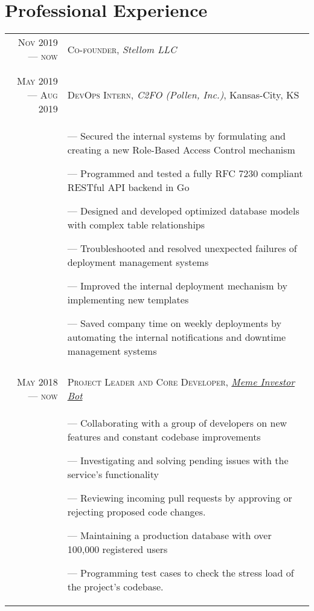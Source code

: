 \documentclass[letterpaper,10pt]{article}
\begin{document}
\section{Professional Experience}
\begin{tabular}{r|p{11cm}}
   \textsc{Nov 2019 --- now} &  \textsc{Co-founder}, \emph{Stellom LLC}\\&\footnotesize{
   } \\\multicolumn{2}{c}{}\\
  
  \textsc{May 2019 --- Aug 2019} &  \textsc{DevOps Intern}, \emph{C2FO (Pollen, Inc.)}, Kansas-City, KS\\&\footnotesize{
    --- Secured the internal systems by formulating and creating a new Role-Based Access Control mechanism
   
    --- Programmed and tested a fully RFC 7230 compliant RESTful API backend in Go 
    
    --- Designed and developed optimized database models with complex table relationships
    
    --- Troubleshooted and resolved unexpected failures of deployment management systems
    
    --- Improved the internal deployment mechanism by implementing new templates
    
    --- Saved company time on weekly deployments by automating the internal notifications and downtime management systems
  } \\\multicolumn{2}{c}{}\\
  
  \textsc{May 2018 --- now} &  \textsc{Project Leader and Core Developer}, \emph{\href{https://github.com/MemeInvestor/memeinvestor_bot}{Meme Investor Bot}}\\&\footnotesize{
    --- Collaborating with a group of developers on new features and constant codebase improvements
    
    --- Investigating and solving pending issues with the service's functionality
    
    --- Reviewing incoming pull requests by approving or rejecting proposed code changes.
    
    --- Maintaining a production database with over 100,000 registered users
    
    --- Programming test cases to check the stress load of the project's codebase.

}
\end{tabular}
\end{document}
